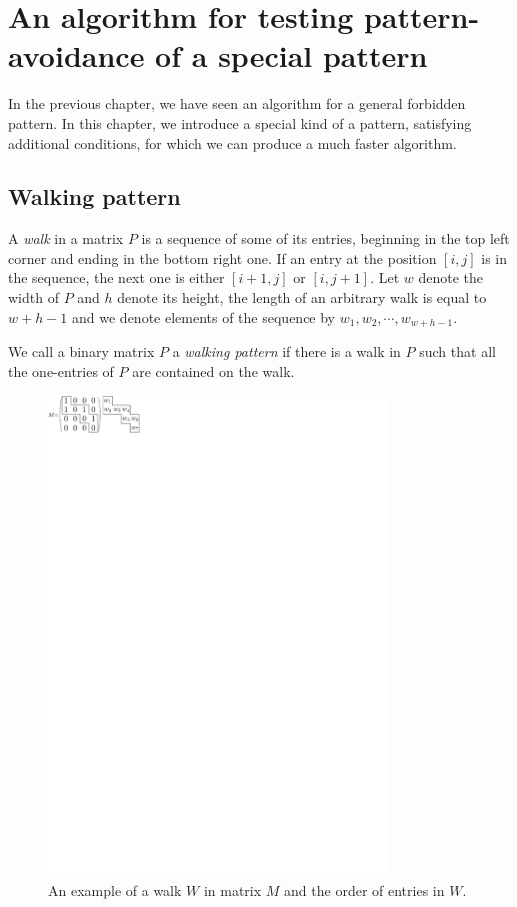 \chapter{An algorithm for testing pattern-avoidance of a special pattern}
\label{chap:walking}
In the previous chapter, we have seen an algorithm for a general forbidden pattern. In this chapter, we introduce a special kind of a pattern, satisfying additional conditions, for which we can produce a much faster algorithm.

\section{Walking pattern}
\begin{defn}
A \emph{walk} in a matrix $P$ is a sequence of some of its entries, beginning in the top left corner and ending in the bottom right one. If an entry at the position $[i,j]$ is in the sequence, the next one is either $[i+1,j]$ or $[i,j+1]$. Let $w$ denote the width of $P$ and $h$ denote its height, the length of an arbitrary walk is equal to $w+h-1$ and we denote elements of the sequence by $w_1,w_2,\cdots,w_{w+h-1}$.
\end{defn}
\begin{defn}
We call a binary matrix $P$ a \emph{walking pattern} if there is a walk in $P$ such that all the one-entries of $P$ are contained on the walk.
\end{defn}
\begin{figure}[h!]
\centering
\includegraphics[width=90mm]{../img/walk.pdf}
\caption{An example of a walk $W$ in matrix $M$ and the order of entries in $W$.}
\label{walk}
\end{figure}

